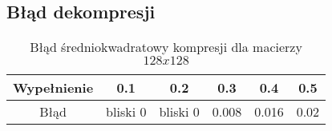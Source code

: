 \documentclass{article}
\begin{document}
\subsection{Błąd dekompresji}

\begin{table}[H]
\begin{center}
\begin{tabular}{ |c|c|c|c|c|c| } 
    
    \hline
    Wypełnienie & 0.1 & 0.2 & 0.3 & 0.4 & 0.5\\ 
    \hline
    Błąd & bliski 0 & bliski 0 & 0.008 & 0.016 & 0.02 \\ 
    \hline
    
\end{tabular}
\caption{Błąd średniokwadratowy kompresji dla macierzy $128 x 128$}
\end{center}
\end{table}
\end{document}

